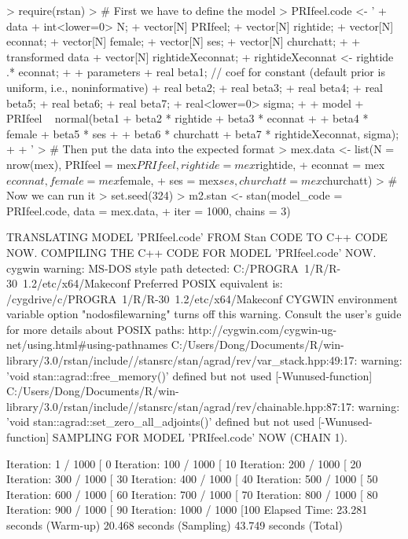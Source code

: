 \documentclass[12pt]{article}
\begin{document}
\begin{enumerate}
\begin{Schunk}
\begin{Sinput}
> require(rstan)
> # First we have to define the model
> PRIfeel.code <- '
+     data {
+         int<lower=0> N;
+         vector[N] PRIfeel;
+         vector[N] rightide;
+         vector[N] econnat;
+         vector[N] female;
+         vector[N] ses;
+         vector[N] churchatt;
+     }
+     transformed data {
+         vector[N] rightideXeconnat;
+         rightideXeconnat <- rightide .* econnat;
+     }
+     parameters {                
+         real beta1;             // coef for constant (default prior is uniform, i.e., noninformative)
+         real beta2;             
+         real beta3;
+         real beta4;
+         real beta5;
+         real beta6;
+         real beta7;
+         real<lower=0> sigma;
+     }
+     model {
+         PRIfeel ~ normal(beta1 + beta2 * rightide + beta3 * econnat +
+                              beta4 * female + beta5 * ses +
+                              beta6 * churchatt + beta7 * rightideXeconnat, sigma);
+     }
+ '
> # Then put the data into the expected format
> mex.data <- list(N = nrow(mex), PRIfeel = mex$PRIfeel, rightide = mex$rightide,
+                    econnat = mex$econnat, female = mex$female, 
+                    ses = mex$ses, churchatt = mex$churchatt)
> # Now we can run it
> set.seed(324)
> m2.stan <- stan(model_code = PRIfeel.code, data = mex.data, 
+                 iter = 1000, chains = 3)
\end{Sinput}
\begin{Soutput}
TRANSLATING MODEL 'PRIfeel.code' FROM Stan CODE TO C++ CODE NOW.
COMPILING THE C++ CODE FOR MODEL 'PRIfeel.code' NOW.
cygwin warning:
  MS-DOS style path detected: C:/PROGRA~1/R/R-30~1.2/etc/x64/Makeconf
  Preferred POSIX equivalent is: /cygdrive/c/PROGRA~1/R/R-30~1.2/etc/x64/Makeconf
  CYGWIN environment variable option "nodosfilewarning" turns off this warning.
  Consult the user's guide for more details about POSIX paths:
    http://cygwin.com/cygwin-ug-net/using.html#using-pathnames
C:/Users/Dong/Documents/R/win-library/3.0/rstan/include//stansrc/stan/agrad/rev/var_stack.hpp:49:17: warning: 'void stan::agrad::free_memory()' defined but not used [-Wunused-function]
C:/Users/Dong/Documents/R/win-library/3.0/rstan/include//stansrc/stan/agrad/rev/chainable.hpp:87:17: warning: 'void stan::agrad::set_zero_all_adjoints()' defined but not used [-Wunused-function]
SAMPLING FOR MODEL 'PRIfeel.code' NOW (CHAIN 1).

Iteration:   1 / 1000 [  0%
Iteration: 100 / 1000 [ 10%
Iteration: 200 / 1000 [ 20%
Iteration: 300 / 1000 [ 30%
Iteration: 400 / 1000 [ 40%
Iteration: 500 / 1000 [ 50%
Iteration: 600 / 1000 [ 60%
Iteration: 700 / 1000 [ 70%
Iteration: 800 / 1000 [ 80%
Iteration: 900 / 1000 [ 90%
Iteration: 1000 / 1000 [100%
Elapsed Time: 23.281 seconds (Warm-up)
              20.468 seconds (Sampling)
              43.749 seconds (Total)


\end{Soutput}
\end{Schunk}
\end{enumerate}
\end{document}
